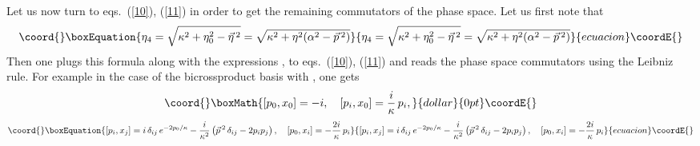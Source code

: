 \documentclass  [12pt] {article}
\def\vp{\vec{p}\, {}^2}
\begin{document}
Let us now turn to eqs.~(\ref{10}), (\ref{11}) in order to get the remaining
commutators of the phase space. Let us first note that
\begin{equation}\coord{}\boxEquation{\label{25}
 \eta_4 = \sqrt{\kappa^2 +\eta_0^2 - \vec{\eta}\,{}^2} = \sqrt{\kappa^2 +\eta^2(\alpha^2 - \vp)}
}{\eta_4 = \sqrt{\kappa^2 +\eta_0^2 - \vec{\eta}\,{}^2} = \sqrt{\kappa^2 +\eta^2(\alpha^2 - \vp)}
}{ecuacion}\coordE{}\end{equation}
Then one plugs this formula along with the expressions \coordHE{}, \coordHE{} to eqs.~(\ref{10}), (\ref{11}) and reads the phase
space commutators using the Leibniz rule. For example in the case of the
bicrossproduct basis with \coordHE{}, one gets
$$\coord{}\boxMath{ [p_0,
x_0] = -i, \quad [p_i, x_0] =  \frac{i}\kappa\, p_i,
}{dollar}{0pt}\coordE{}$$
\begin{equation}\coord{}\boxEquation{\label{26}
[p_i, x_j] = i\, \delta_{ij} \, e^{-
2p_0/\kappa} -\frac{i}{\kappa^2}\left(\vec{p}\,{}^{ 2}\, \delta_{ij} - 2
p_{i}p_{j}\right), \quad [p_0, x_i] = -\frac{2i}\kappa\, p_i
}{[p_i, x_j] = i\, \delta_{ij} \, e^{-
2p_0/\kappa} -\frac{i}{\kappa^2}\left(\vec{p}\,{}^{ 2}\, \delta_{ij} - 2
p_{i}p_{j}\right), \quad [p_0, x_i] = -\frac{2i}\kappa\, p_i
}{ecuacion}\coordE{}\end{equation}
\end{document}
